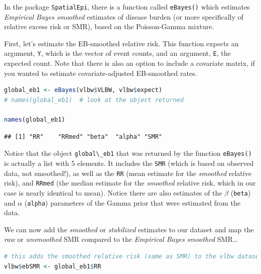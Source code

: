 \documentclass[
]{book}
\newcommand{\passthrough}[1]{#1}
\begin{document}
In the package \passthrough{\lstinline!SpatialEpi!}, there is a function called \passthrough{\lstinline!eBayes()!} which estimates \emph{Empirical Bayes smoothed} estimates of disease burden (or more specifically of relative excess risk or SMR), based on the Poisson-Gamma mixture.

First, let's estimate the EB-smoothed relative risk. This function expects an argument, \passthrough{\lstinline!Y!}, which is the vector of event counts, and an argument, \passthrough{\lstinline!E!}, the expected count. Note that there is also an option to include a covariate matrix, if you wanted to estimate covariate-adjusted EB-smoothed rates.

\begin{lstlisting}[language=R]
global_eb1 <- eBayes(vlbw$VLBW, vlbw$expect)
# names(global_eb1)  # look at the object returned

names(global_eb1)
\end{lstlisting}

\begin{lstlisting}
## [1] "RR"    "RRmed" "beta"  "alpha" "SMR"
\end{lstlisting}

Notice that the object \passthrough{\lstinline!global\_eb1!} that was returned by the function \passthrough{\lstinline!eBayes()!} is actually a list with 5 elements. It includes the \passthrough{\lstinline!SMR!} (which is based on observed data, not smoothed!), as well as the \passthrough{\lstinline!RR!} (mean estimate for the \emph{smoothed} relative risk), and \passthrough{\lstinline!RRmed!} (the median estimate for the \emph{smoothed} relative risk, which in our case is nearly identical to mean). Notice there are also estimates of the \(\beta\) (\passthrough{\lstinline!beta!}) and \(\alpha\) (\passthrough{\lstinline!alpha!}) parameters of the Gamma prior that were estimated from the data.

We can now add the \emph{smoothed} or \emph{stabilized} estimates to our dataset and map the \emph{raw} or \emph{unsmoothed} SMR compared to the \emph{Empirical Bayes smoothed} SMR\ldots{}

\begin{lstlisting}[language=R]
# this adds the smoothed relative risk (same as SMR) to the vlbw dataset
vlbw$ebSMR <- global_eb1$RR
\end{lstlisting}
\end{document}
